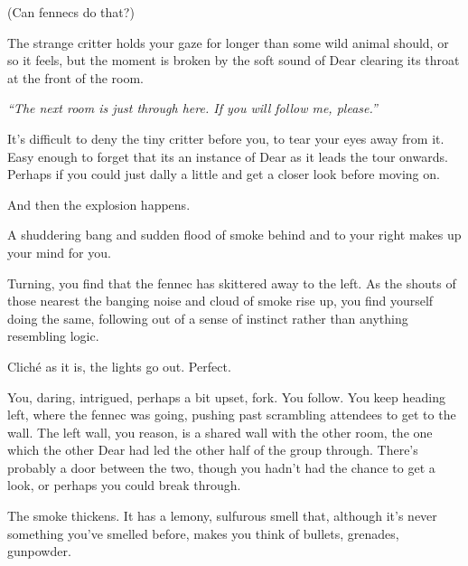 \null
\vfill

\begin{flushright}
\footnotesize
  (Can fennecs do that?)
\end{flushright}

\newpage

\null
\vfill

The strange critter holds your gaze for longer than some wild animal should, or so it feels, but the moment is broken by the soft sound of Dear clearing its throat at the front of the room.

\emph{``The next room is just through here. If you will follow me, please.''}

It's difficult to deny the tiny critter before you, to tear your eyes away from it. Easy enough to forget that its an instance of Dear as it leads the tour onwards. Perhaps if you could just dally a little and get a closer look before moving on.

And then the explosion happens.

\vfill

\newpage

\null
\vfill

A shuddering bang and sudden flood of smoke behind and to your right makes up your mind for you.

Turning, you find that the fennec has skittered away to the left. As the shouts of those nearest the banging noise and cloud of smoke rise up, you find yourself doing the same, following out of a sense of instinct rather than anything resembling logic.

\vfill

\newpage

\null
\vfill

Cliché as it is, the lights go out. Perfect.

\vfill

\newpage

\null
\vfill

You, daring, intrigued, perhaps a bit upset, fork. You follow. You keep heading left, where the fennec was going, pushing past scrambling attendees to get to the wall. The left wall, you reason, is a shared wall with the other room, the one which the other Dear had led the other half of the group through. There's probably a door between the two, though you hadn't had the chance to get a look, or perhaps you could break through.

The smoke thickens. It has a lemony, sulfurous smell that, although it's never something you've smelled before, makes you think of bullets, grenades, gunpowder.

